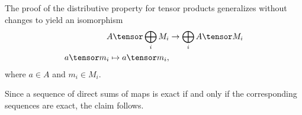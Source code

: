 The proof of the distributive property for tensor products generalizes without
changes to yield an isomorphism
\begin{align*}
	A\tensor \bigoplus_i M_i &\to \bigoplus_i A\tensor M_i\\
	a \tensor m_i \mapsto a\tensor m_i,
\end{align*}
where $a \in A$ and $m_i \in M_i$.

Since a sequence of direct sums of maps is exact if and only if the corresponding
sequences are exact, the claim follows.
